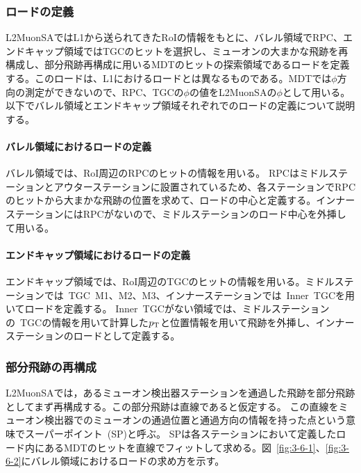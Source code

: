 \subsubsection{ロードの定義}
L2MuonSAではL1から送られてきたRoIの情報をもとに、バレル領域でRPC、エンドキャップ領域ではTGCのヒットを選択し、ミューオンの大まかな飛跡を再構成し、部分飛跡再構成に用いるMDTのヒットの探索領域であるロードを定義する。このロードは、L1におけるロードとは異なるものである。MDTでは$\phi$方向の測定ができないので、RPC、TGCの$\phi$の値をL2MuonSAの$\phi$として用いる。
以下でバレル領域とエンドキャップ領域それぞれでのロードの定義について説明する。

\paragraph{バレル領域におけるロードの定義}
バレル領域では、RoI周辺のRPCのヒットの情報を用いる。
RPCはミドルステーションとアウターステーションに設置されているため、各ステーションでRPCのヒットから大まかな飛跡の位置を求めて、ロードの中心と定義する。インナーステーションにはRPCがないので、ミドルステーションのロード中心を外挿して用いる。

\paragraph{エンドキャップ領域におけるロードの定義}
エンドキャップ領域では、RoI周辺のTGCのヒットの情報を用いる。ミドルステーションでは~TGC~M1、M2、M3、インナーステーションでは~Inner~TGCを用いてロードを定義する。
Inner~TGCがない領域では、ミドルステーションの~TGCの情報を用いて計算した$p_\mathrm{T}$と位置情報を用いて飛跡を外挿し、インナーステーションのロードとして定義する。

\subsubsection{部分飛跡の再構成}
L2MuonSAでは，あるミューオン検出器ステーションを通過した飛跡を部分飛跡としてまず再構成する。この部分飛跡は直線であると仮定する。
この直線をミューオン検出器でのミューオンの通過位置と通過方向の情報を持った点という意味でスーパーポイント~(SP)と呼ぶ。
SPは各ステーションにおいて定義したロード内にあるMDTのヒットを直線でフィットして求める。図~\ref{fig:3-6-1}、\ref{fig:3-6-2}にバレル領域におけるロードの求め方を示す。

